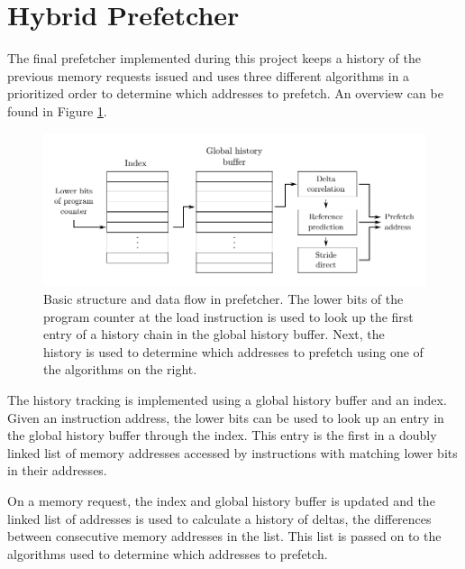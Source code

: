\section{Hybrid Prefetcher}
\label{sec:prefetcher}

The final prefetcher implemented during this project keeps a history of the
previous memory requests issued and uses three different algorithms in a
prioritized order to determine which addresses to prefetch.
An overview can be found in Figure \ref{fig:prefetcher}.

\begin{figure}[h]
	\centering
	\includegraphics{images/prefetcher.pdf}
	\caption{
		Basic structure and data flow in prefetcher. The lower bits of the
		program counter at the load instruction is used to look up the first
		entry of a history chain in the global history buffer. Next, the history
		is used to determine which addresses to prefetch using one of the
		algorithms on the right.
	}
	\label{fig:prefetcher}
\end{figure}

The history tracking is implemented using a global history buffer and an index.
Given an instruction address, the lower bits can be used to look up an entry in
the global history buffer through the index.
This entry is the first in a doubly linked list of memory addresses accessed by
instructions with matching lower bits in their addresses.

On a memory request, the index and global history buffer is updated and the
linked list of addresses is used to calculate a history of deltas, the
differences between consecutive memory addresses in the list.
This list is passed on to the algorithms used to determine which addresses to
prefetch.

